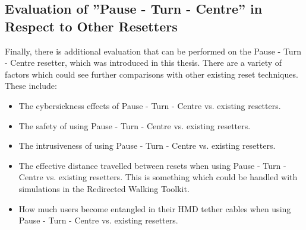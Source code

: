 \subsection{Evaluation of ''Pause - Turn - Centre'' in Respect to Other Resetters}
Finally, there is additional evaluation that can be performed on the Pause - Turn - Centre resetter, which was introduced in this thesis. There are a variety of factors which could see further comparisons with other existing reset techniques. These include:

\begin{itemize}
    \item The cybersickness effects of Pause - Turn - Centre vs. existing resetters.
    \item The safety of using Pause - Turn - Centre vs. existing resetters.
    \item The intrusiveness of using Pause - Turn - Centre vs. existing resetters.
    \item The effective distance travelled between resets when using Pause - Turn - Centre vs. existing resetters. This is something which could be handled with simulations in the Redirected Walking Toolkit. 
    \item How much users become entangled in their HMD tether cables when using Pause - Turn - Centre vs. existing resetters.
\end{itemize}
      
\iffalse
   * Having people's first experience with VR be with redirected walking
      * They might normalise the redirected walking elements
         * \todo{Will have to look deeper into the data on people with no experience and how many detections they did}

\subsection{Distractor Salience and Optical Flow}
* How does salience impact optical flow? How does this then impact the noticeability of redirection?
* Already covered by other sections I'd say
\fi